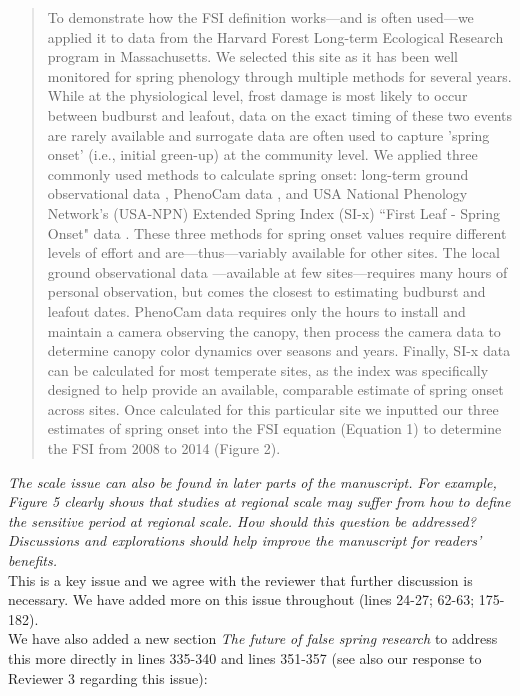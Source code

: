 \documentclass[11pt,a4paper]{article}
\begin{document}
\begin{quotation}
To demonstrate how the FSI definition works---and is often used---we applied it to data from the Harvard Forest Long-term Ecological Research program in Massachusetts. We selected this site as it has been well monitored for spring phenology through multiple methods for several years. While at the physiological level, frost damage is most likely to occur between budburst and leafout, data on the exact timing of these two events are rarely available and surrogate data are often used to capture 'spring onset' (i.e., initial green-up) at the community level. We applied three commonly used methods to calculate spring onset: long-term ground observational data \citep{Okeefe2014}, PhenoCam data \citep{Richardson2015}, and USA National Phenology Network's (USA-NPN) Extended Spring Index (SI-x) ``First Leaf - Spring Onset" data \citep{USA-NPN2016}. These three methods for spring onset values require different levels of effort and are---thus---variably available for other sites. The local ground observational data \citep{Okeefe2014}---available at few sites---requires many hours of personal observation, but comes the closest to estimating budburst and leafout dates. PhenoCam data requires only the hours to install and maintain a camera observing the canopy, then process the camera data to determine canopy color dynamics over seasons and years. Finally, SI-x data can be calculated for most temperate sites, as the index was specifically designed to help provide an available, comparable estimate of spring onset across sites. Once calculated for this particular site we inputted our three estimates of spring onset into the FSI equation (Equation 1) to determine the FSI from 2008 to 2014 (Figure 2). 
\end{quotation}


\textit{The scale issue can also be found in later parts of the manuscript. For example, Figure 5 clearly shows that studies at regional scale may suffer from how to define the sensitive period at regional scale. How should this question be addressed? Discussions and explorations should help improve the manuscript for readers' benefits.} \\

This is a key issue and we agree with the reviewer that further discussion is necessary. We have added more on this issue throughout (lines 24-27; 62-63; 175-182). \\

We have also added a new section \textit{The future of false spring research} to address this more directly in lines 335-340 and lines 351-357 (see also our response to Reviewer 3 regarding this issue):\\ 
\end{document}
